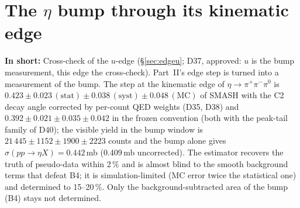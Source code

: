 \documentclass[11pt,a4paper]{article}
\newcommand{\piz}{\ensuremath{\pi^{0}}\xspace}
\newcommand{\pipi}{\ensuremath{\pi^{+}\pi^{-}}\xspace}
\newcommand{\sigeta}{\ensuremath{\sigma(pp\to\eta X)}\xspace}
\newcommand{\tipbox}[1]{\par\noindent\colorbox{blue!6}{\parbox{\dimexpr\linewidth-2\fboxsep\relax}{#1}}\par}
\newcommand{\inshort}[1]{\tipbox{\textbf{In short:} #1}}%
\begin{document}
\section{The \texorpdfstring{$\eta$}{eta} bump through its kinematic edge}
\label{sec:bedge}
\inshort{Cross-check of the $u$-edge (\S\ref{sec:edgeu}; D37, approved: $u$ is the bump measurement, this edge the cross-check). Part~II's edge step is turned into a measurement of the bump. The step at the kinematic edge of $\eta\to\pipi\piz$ is
$0.423\pm0.023\,(\mathrm{stat})\pm0.038\,(\mathrm{syst})\pm0.048\,(\mathrm{MC})$ of SMASH with the C2 decay angle corrected by per-count QED
weights (D35, D38) and $0.392\pm0.021\pm0.035\pm0.042$ in the frozen convention (both with the peak-tail family of D40); the visible yield in the
bump window is $21\,445\pm1152\pm1900\pm2223$ counts and the bump alone gives $\sigeta=0.442$\,mb (0.409\,mb uncorrected). The estimator recovers the truth of pseudo-data within 2\,\% and is
almost blind to the smooth background terms that defeat B4; it is simulation-limited (MC error twice the statistical one) and determined to
15--20\,\%. Only the background-subtracted area of the bump (B4) stays not determined.}
\end{document}
